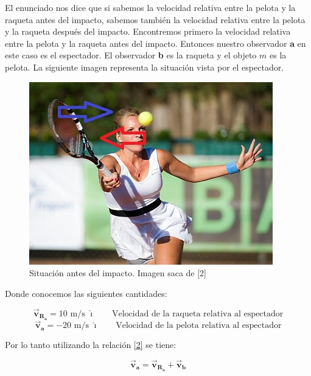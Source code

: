 \documentclass[a4paper,11pt]{article}
\begin{document}
	El enunciado nos dice que si sabemos la velocidad relativa entre la pelota y la raqueta antes del impacto, sabemos también la velocidad relativa entre la pelota y la raqueta después del impacto. Encontremos primero la velocidad relativa entre la pelota y la raqueta antes del impacto. Entonces nuestro observador \textbf{a}  en este caso es el espectador. El  observador \textbf{b} es la raqueta y el objeto $m$ es la pelota. La siguiente imagen representa la situación vista por el espectador.
	
	
	
	
	\begin{figure}[h]
		\includegraphics[width=1.0\linewidth]{./im/ten}
		\caption{Situación antes del impacto. Imagen saca de [2]}
	\end{figure}
	
	
	
	Donde conocemos las siguientes cantidades:
	
	
	
	
	$$ \vec{\textbf{v}}_{\textbf{R}_\textbf{a}} = 10 \text{ m/s } \boldsymbol{\hat{\imath}} \qquad \text{Velocidad de la raqueta relativa al espectador}$$
	$$ \vec{\textbf{v}}_{\textbf{a}} = -20 \text{ m/s } \boldsymbol{\hat{\imath}} \qquad \text{Velocidad de la pelota relativa al espectador}$$ 
	
	Por lo tanto utilizando la relación \ref{2} se tiene:
	
	
	\begin{equation}
	\vec{\textbf{v}}_{\textbf{a}} = \vec{\textbf{v}}_{\textbf{R}_\textbf{a}} + \vec{\textbf{v}}_{\textbf{b}} 
	\end{equation}
	
\end{document}
